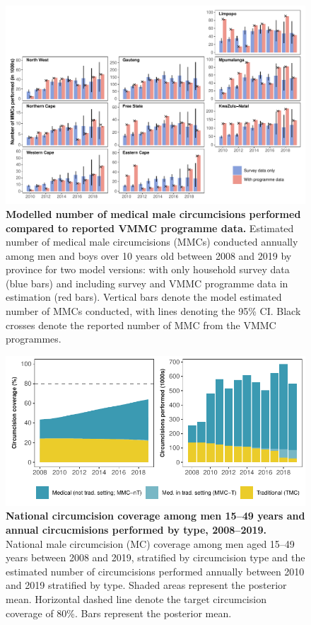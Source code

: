 \documentclass{article}
\begin{document}

\begin{figure}[H]
  \centering
  \includegraphics[width = \linewidth]{Figures/paper/Figure2.pdf}
  \caption{{\bf Modelled number of medical male circumcisions performed compared to reported VMMC programme data.} Estimated number of medical male circumcisions (MMCs) conducted annually among men and boys over 10 years old between 2008 and 2019 by province for two model versions: with only household survey data (blue bars) and including survey and VMMC programme data in estimation (red bars). Vertical bars denote the model estimated number of MMCs conducted, with lines denoting the 95\% CI. Black crosses denote the reported number of MMC from the VMMC programmes.}
  \label{fig::comparisonMMC}
\end{figure}


\begin{figure}[H]
  \centering
  \includegraphics[width = 5.2in]{Figures/paper/Figure3.pdf}
  \caption{{\bf National circumcision coverage among men 15--49 years and annual circucmisions performed by type, 2008--2019.}
    National male circumcision (MC) coverage among men aged 15--49 years between 2008 and 2019, stratified by circumcision type and the estimated number of circumcisions performed annually between 2010 and 2019 stratified by type. Shaded areas represent the posterior mean. Horizontal dashed line denote the target circumcision coverage of 80\%. Bars represent the posterior mean. }
  \label{fig::1549prev}
\end{figure}
\end{document}
